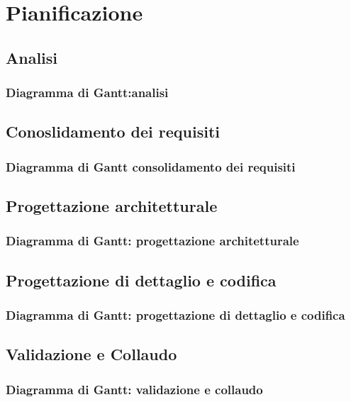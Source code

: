 \chapter{Pianificazione}\label{Pianificazione}

\section{Analisi}\label{4.1}

\subsection{Diagramma di Gantt:analisi}\label{4.1.1}

\section{Conoslidamento dei requisiti}\label{4.2}

\subsection{Diagramma di Gantt consolidamento dei requisiti}\label{4.2.1}

\section{Progettazione architetturale}\label{4.3}

\subsection{Diagramma di Gantt: progettazione architetturale}\label{4.3.1}

\section{Progettazione di dettaglio e codifica}\label{4.4}

\subsection{Diagramma di Gantt: progettazione di dettaglio e codifica}\label{4.4.1}

\section{Validazione e Collaudo}\label{4.5}

\subsection{Diagramma di Gantt: validazione e collaudo}\label{4.5.1}